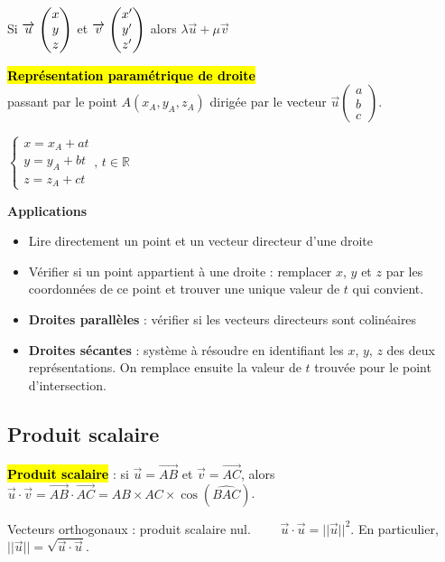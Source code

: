 \documentclass[10pt,fleqn, openany, landscape, twocolumn]{book} %
\begin{document}
Si $\renewcommand{\arraystretch}{1}\coorde{u}{x}{y}{z}$ et $\renewcommand{\arraystretch}{1}\coorde{v}{x'}{y'}{z'}$ alors $\lambda \vec u + \mu \vec v$  \renewcommand{\arraystretch}{1}

\begin{minipage}{0.7\linewidth}
\hl{\textbf{Représentation paramétrique de droite}} \\passant par le point $A(x_A, y_A, z_A)$ dirigée par le vecteur $\vec u\begin{pmatrix}a\\b\\c\end{pmatrix}$.
\end{minipage}\hfill\begin{minipage}{0.28\linewidth}
$\left\{\begin{array}{l}x=x_A+at\\y=y_A+bt \\ z=z_A+ct\end{array}\right.,\,t\in\mathbb{R}$\end{minipage}
\vspace{-0.25cm}
\textbf{Applications}
\begin{itemize}
\item Lire directement un point et un vecteur directeur d'une droite
\item Vérifier si un point appartient à une droite : remplacer $x$, $y$ et $z$ par les coordonnées de ce point et trouver une unique valeur de $t$ qui convient.
\item \textbf{Droites parallèles} : vérifier si les vecteurs directeurs sont colinéaires
\item \textbf{Droites sécantes} : système à résoudre en identifiant les $x$, $y$, $z$ des deux représentations. On remplace ensuite la valeur de $t$ trouvée pour le point d'intersection.
\end{itemize}

\subsection*{Produit scalaire}

\hl{\textbf{Produit scalaire}} : si $\vec u=\overrightarrow{AB}$ et $\vec v =\overrightarrow{AC}$, alors $\vec u\cdot \vec v =\overrightarrow{AB} \cdot \overrightarrow{AC} = AB \times AC \times \cos(\widehat{BAC})$.

Vecteurs orthogonaux : produit scalaire nul. $\qquad \vec u \cdot \vec u = || \vec u||^2$. En particulier, $||\vec u||=\sqrt{\vec u \cdot \vec u}$. 
\end{document}
